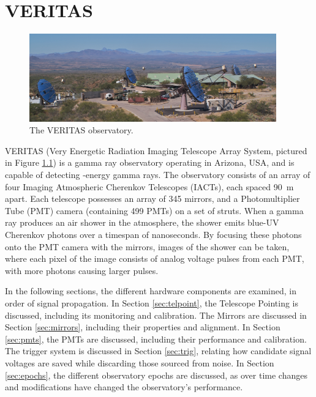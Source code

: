 \cleartooddpage[\thispagestyle{empty}]
\chapter{VERITAS}\label{chapter:veritas}

\begin{figure}[ht]
  \centering
  \includegraphics[width=0.95\textwidth]{images/veritas_array_v6}
  \caption[VERITAS Array]{
    The VERITAS observatory.}
  \label{fig:veritasarray}
\end{figure}

VERITAS (Very Energetic Radiation Imaging Telescope Array System, pictured in Figure \ref{fig:veritasarray}) is a gamma ray observatory operating in Arizona, USA, and is capable of detecting \nicetilde{}\TeV{}-energy gamma rays.
The observatory consists of an array of four Imaging Atmospheric Cherenkov Telescopes (IACTs), each spaced \nicetilde{}\SI{90}{m} apart.
Each telescope possesses an array of 345 mirrors, and a Photomultiplier Tube (PMT) camera (containing 499 PMTs) on a set of struts.
When a gamma ray produces an air shower in the atmosphere, the shower emits blue-UV Cherenkov photons over a timespan of nanoseconds.
By focusing these photons onto the PMT camera with the mirrors, images of the shower can be taken, where each pixel of the image consists of analog voltage pulses from each PMT, with more photons causing larger pulses.


In the following sections, the different hardware components are examined, in order of signal propagation.
In Section \ref{sec:telpoint}, the Telescope Pointing is discussed, including its monitoring and calibration.
The Mirrors are discussed in Section \ref{sec:mirrors}, including their properties and alignment.
In Section \ref{sec:pmts}, the PMTs are discussed, including their performance and calibration.
The trigger system is discussed in Section \ref{sec:trig}, relating how candidate signal voltages are saved while discarding those sourced from noise.
In Section \ref{sec:epochs}, the different observatory epochs are discussed, as over time changes and modifications have changed the observatory's performance.



